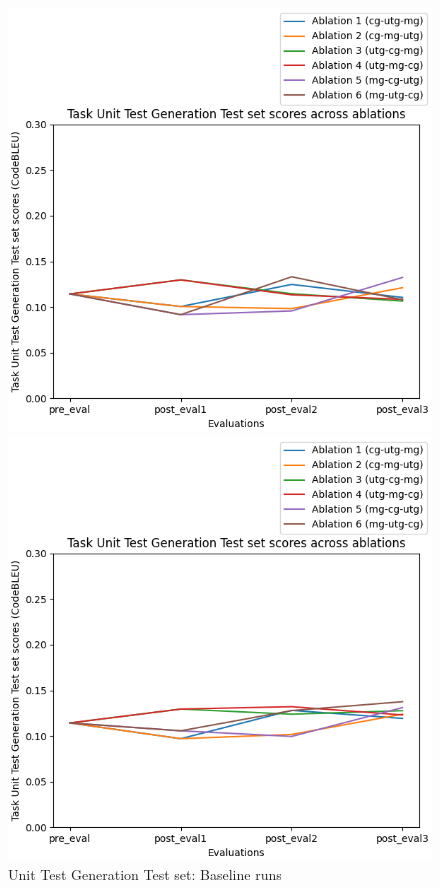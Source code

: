 \begin{figure}[H]
    \centering
    \begin{minipage}{0.45\textwidth}
        \centering
        \includegraphics[width=1.1\textwidth]{Figures/results/code_baseline_graphs/task_eval/seed_averaged_task_utg_test_eval_baseline.png} %
        \captionsetup{width=1.1\textwidth}
        \caption{Unit Test Generation Test set: Baseline runs}
        \label{UTGTestBaseline}
    \end{minipage}\hfill
    \begin{minipage}{0.45\textwidth}
        \centering
        \includegraphics[width=1.1\textwidth]{Figures/results/code_mitigation_graphs/task_eval/seed_averaged_task_utg_test_eval_mitigation.png} %

\end{minipage}
\end{figure}
